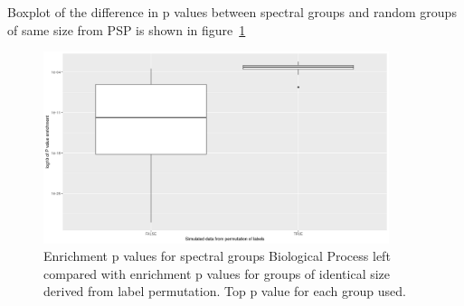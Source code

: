 Boxplot of the difference in p values between spectral groups and random groups of same size from PSP is shown in figure~\ref{fig:topGO_permutation}
\begin{figure}
    \centering
    \includegraphics[width=0.9\textwidth]{images/Rplot_EnrichmentGO_permuted_labels.png}
    \caption{Enrichment p values for spectral groups Biological Process left compared with enrichment p values for groups of identical size derived from label permutation. Top p value for each group used.}
    \label{fig:topGO_permutation}
\end{figure}
